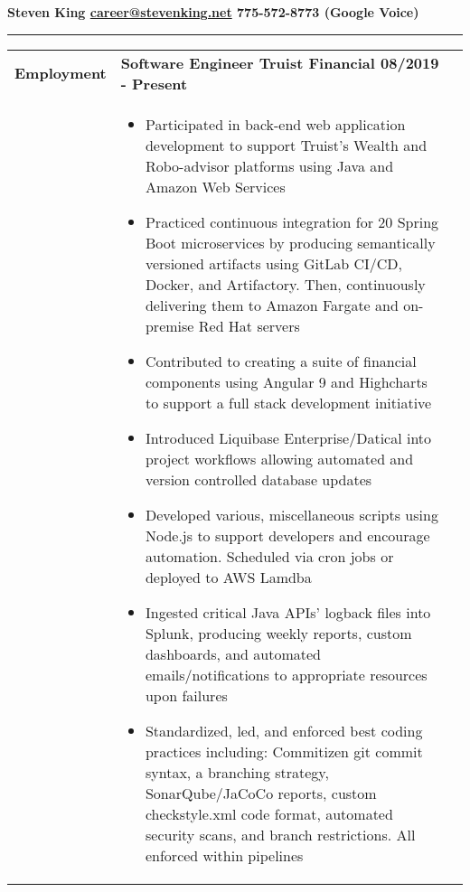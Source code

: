 \documentclass[final]{letter}
\begin{document}
	\begin{center}
		\bf\large {\fontsize{34}{12}\selectfont Steven King} \hfill \href{mailto:career@stevenking.net}{career@stevenking.net} \hfill 775-572-8773 (Google Voice) 
	\end{center}
	
	\rule{\textwidth}{1pt}	

	\begin{tabularx}{\linewidth}{
		>{\raggedright\bf\Large} p{9em}X
		>{}X
	} 
		Employment & \quad\large\bf{Software Engineer \hfill {Truist Financial} \hfill 08/2019 - Present} \\
		& \begin{itemize}[topsep=1pt,noitemsep]
			\item Participated in back-end web application development to support Truist's Wealth and Robo-advisor platforms using Java and Amazon Web Services
			\item Practiced continuous integration for 20 Spring Boot microservices by producing semantically versioned artifacts using GitLab CI/CD, Docker, and Artifactory. Then, continuously delivering them to Amazon Fargate and on-premise Red Hat servers 
			\item Contributed to creating a suite of financial components using Angular 9 and Highcharts to support a full stack development initiative
			\item Introduced Liquibase Enterprise/Datical into project workflows allowing automated and version controlled database updates
			\item Developed various, miscellaneous scripts using Node.js to support developers and encourage automation. Scheduled via cron jobs or deployed to AWS Lamdba
			\item Ingested critical Java APIs' logback files into Splunk, producing weekly reports, custom dashboards, and automated emails/notifications to appropriate resources upon failures
			\item Standardized, led, and enforced best coding practices including: Commitizen git commit syntax, a branching strategy, SonarQube/JaCoCo reports, custom checkstyle.xml code format, automated security scans, and branch restrictions. All enforced within pipelines
		\end{itemize} \\
			

\end{tabularx}
\end{document}
